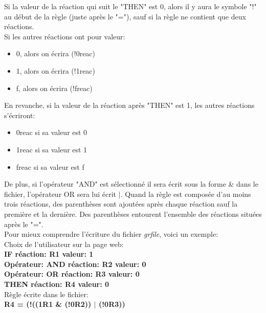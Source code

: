 Si la valeur de la réaction qui suit le "THEN" est 0, alors il y aura le symbole "!" au début de la règle (juste après le "="), sauf si la règle ne contient que deux réactions.\\
Si les autres réactions ont pour valeur:
\begin{itemize}
\item 0, alors on écrira (!0reac)
\item 1, alors on écrira (!1reac)
\item f, alors on écrira (!freac)
\end{itemize}
En revanche, si la valeur de la réaction après "THEN" est 1, les autres réactions s'écriront:
\begin{itemize}
\item 0reac si sa valeur est 0
\item 1reac si sa valeur est 1
\item freac si sa valeur est f
\end{itemize}
De plus, si l'opérateur "AND" est sélectionné il sera écrit sous la forme \& dans le fichier, l'opérateur OR sera lui écrit $|$. Quand la règle est composée d'au moins trois réactions, des parenthèses sont ajoutées après chaque réaction sauf la première et la dernière. Des parenthèses entourent l'ensemble des réactions situées après le "=".\\

Pour mieux comprendre l'écriture du fichier \emph{grfile}, voici un exemple:\\
Choix de l'utilisateur sur la page web:\\
\textbf{IF réaction: R1 valeur: 1\\
Opérateur: AND réaction: R2 valeur: 0\\
Opérateur: OR réaction: R3 valeur: 0\\
THEN réaction: R4 valeur: 0}\\

Règle écrite dans le fichier: \\
\textbf{R4 = (!((1R1 \& (!0R2)) $|$ (!0R3))}
